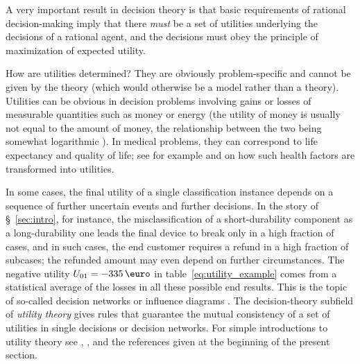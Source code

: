 \documentclass[\ifafour a4paper,12pt,\else a5paper,10pt,\fi%
onecolumn,oneside,article,%
british%
]{memoir}
\theoremstyle{remark}
\theoremstyle{innote}
\newcommand*{\p}{\mathrm{p}}%
\renewcommand*{\|}[1][]{\nonscript\:#1\vert\nonscript\:\mathopen{}}
\newcommand*{\sect}{\S}%
\newcommand*{\chap}{ch.}%
\newcommand*{\chaps}{chs}%
\newcommand*{\eg}{{e.g.}}
\newcommand*{\eu}{\bar{U}}
\begin{document}

A very important result in decision theory is that basic requirements of rational decision-making imply that there \emph{must} be a set of utilities underlying the decisions of a rational agent, and the decisions must obey the principle of maximization of expected utility\autocites[\sect~15.2]{russelletal1995_r2022}[\chaps~2--3]{neumannetal1944_r1955}.

How are utilities determined? They are obviously problem-specific and cannot be given by the theory (which would otherwise be a model rather than a theory). Utilities can be obvious in decision problems involving gains or losses of measurable quantities such as money or energy (the utility of money is usually not equal to the amount of money, the relationship between the two being somewhat logarithmic \autocites[\eg][pp.~203--204]{north1968}[\chap~4]{raiffa1968_r1970}). In medical problems, they can correspond to life expectancy and quality of life; see for example \cite[esp. \chap~8 and \sect~11.2.9]{soxetal1988_r2013} and \cite[esp. \chap~4]{huninketal2001_r2014} on how such health factors are transformed into utilities.

In some cases, the final utility of a single classification instance depends on a sequence of further uncertain events and further decisions. In the story of \sect~\ref{sec:intro}, for instance, the misclassification of a short-durability component as a long-durability one leads the final device to break only in a high fraction of cases, and in such cases, the end customer requires a refund in a high fraction of subcases; the refunded amount may even depend on further circumstances. The negative utility $U_{01} = -335\,\text{\texteuro}$ in table~\eqref{eq:utility_example} comes from a statistical average of the losses in all these possible end results. This is the topic of so-called decision networks or influence diagrams \autocites[Besides the general references already given:][\sect~15.5]{russelletal1995_r2022}{howardetal1984b_r2005}. The decision-theory subfield of \emph{utility theory} gives rules that guarantee the mutual consistency of a set of utilities in single decisions or decision networks. For simple introductions to utility theory see \cite[\sect~15.2]{russelletal1995_r2022}, \cite[pp.~201--205]{north1968}, and the references given at the beginning of the present section.
\end{document}
